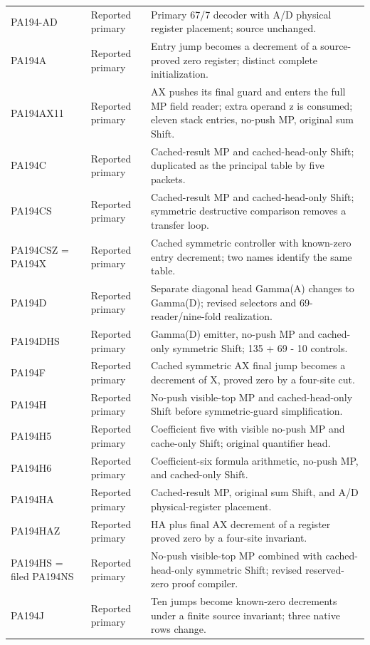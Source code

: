 \begin{longtable}{@{}p{.25\linewidth}p{.17\linewidth}p{.53\linewidth}@{}}
PA194-AD & Reported primary & Primary 67/7 decoder with A/D physical register placement; source unchanged. \\
PA194A & Reported primary & Entry jump becomes a decrement of a source-proved zero register; distinct complete initialization. \\
PA194AX11 & Reported primary & AX pushes its final guard and enters the full MP field reader; extra operand z is consumed; eleven stack entries, no-push MP, original sum Shift. \\
PA194C & Reported primary & Cached-result MP and cached-head-only Shift; duplicated as the principal table by five packets. \\
PA194CS & Reported primary & Cached-result MP and cached-head-only Shift; symmetric destructive comparison removes a transfer loop. \\
PA194CSZ = PA194X & Reported primary & Cached symmetric controller with known-zero entry decrement; two names identify the same table. \\
PA194D & Reported primary & Separate diagonal head Gamma(A) changes to Gamma(D); revised selectors and 69-reader/nine-fold realization. \\
PA194DHS & Reported primary & Gamma(D) emitter, no-push MP and cached-only symmetric Shift; 135 + 69 - 10 controls. \\
PA194F & Reported primary & Cached symmetric AX final jump becomes a decrement of X, proved zero by a four-site cut. \\
PA194H & Reported primary & No-push visible-top MP and cached-head-only Shift before symmetric-guard simplification. \\
PA194H5 & Reported primary & Coefficient five with visible no-push MP and cache-only Shift; original quantifier head. \\
PA194H6 & Reported primary & Coefficient-six formula arithmetic, no-push MP, and cached-only Shift. \\
PA194HA & Reported primary & Cached-result MP, original sum Shift, and A/D physical-register placement. \\
PA194HAZ & Reported primary & HA plus final AX decrement of a register proved zero by a four-site invariant. \\
PA194HS = filed PA194NS & Reported primary & No-push visible-top MP combined with cached-head-only symmetric Shift; revised reserved-zero proof compiler. \\
PA194J & Reported primary & Ten jumps become known-zero decrements under a finite source invariant; three native rows change. \\

\end{longtable}
